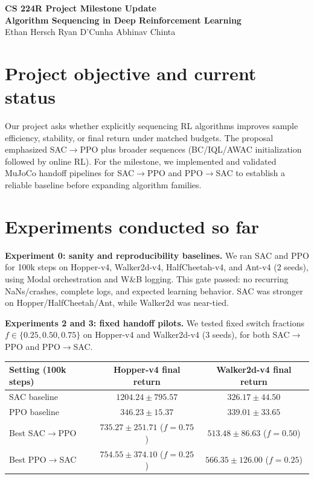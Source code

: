 \documentclass[10pt]{article}
\begin{document}
\begin{center}
    {\Large \textbf{CS 224R Project Milestone Update}}\\[-1pt]
    {\normalsize \textbf{Algorithm Sequencing in Deep Reinforcement Learning}}\\[-1pt]
    Ethan Hersch \quad Ryan D'Cunha \quad Abhinav Chinta
\end{center}
\small

\section*{Project objective and current status}
Our project asks whether explicitly sequencing RL algorithms improves sample efficiency, stability, or final return under matched budgets. The proposal emphasized SAC$\rightarrow$PPO plus broader sequences (BC/IQL/AWAC initialization followed by online RL). For the milestone, we implemented and validated MuJoCo handoff pipelines for SAC$\rightarrow$PPO and PPO$\rightarrow$SAC to establish a reliable baseline before expanding algorithm families.

\section*{Experiments conducted so far}
\textbf{Experiment 0: sanity and reproducibility baselines.} We ran SAC and PPO for 100k steps on Hopper-v4, Walker2d-v4, HalfCheetah-v4, and Ant-v4 (2 seeds), using Modal orchestration and W\&B logging. This gate passed: no recurring NaNs/crashes, complete logs, and expected learning behavior. SAC was stronger on Hopper/HalfCheetah/Ant, while Walker2d was near-tied.

\textbf{Experiments 2 and 3: fixed handoff pilots.} We tested fixed switch fractions $f\in\{0.25,0.50,0.75\}$ on Hopper-v4 and Walker2d-v4 (3 seeds), for both SAC$\rightarrow$PPO and PPO$\rightarrow$SAC.

\begin{center}
    \small
    \begin{tabular}{lcc}
        \toprule
        Setting (100k steps)     & Hopper-v4 final return         & Walker2d-v4 final return       \\
        \midrule
        SAC baseline             & $1204.24 \pm 795.57$           & $326.17 \pm 44.50$             \\
        PPO baseline             & $346.23 \pm 15.37$             & $339.01 \pm 33.65$             \\
        Best SAC$\rightarrow$PPO & $735.27 \pm 251.71$ ($f=0.75$) & $513.48 \pm 86.63$ ($f=0.50$)  \\
        Best PPO$\rightarrow$SAC & $754.55 \pm 374.10$ ($f=0.25$) & $566.35 \pm 126.00$ ($f=0.25$) \\
        \bottomrule
    \end{tabular}
\end{center}
\end{document}
